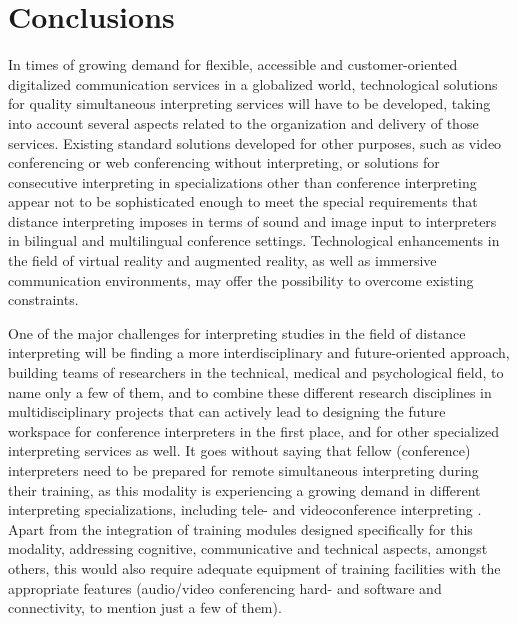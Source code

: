\documentclass[output=paper]{langsci/langscibook}
\begin{document}
\section{Conclusions}
\label{sec:ziegler:07}
In times of growing demand for flexible, accessible and customer-oriented digitalized communication services in a globalized world, technological solutions for quality simultaneous interpreting services will have to be developed, taking into account several aspects related to the organization and delivery of those services. Existing standard solutions developed for other purposes, such as video conferencing or web conferencing without interpreting, or solutions for consecutive interpreting in specializations other than conference interpreting appear not to be sophisticated enough to meet the special requirements that distance interpreting imposes in terms of sound and image input to interpreters in bilingual and multilingual conference settings. Technological enhancements in the field of virtual reality and augmented reality, as well as immersive communication environments, may offer the possibility to overcome existing constraints.

One of the major challenges for interpreting studies in the field of distance interpreting will be finding a more interdisciplinary and future-oriented approach, building teams of researchers in the technical, medical and psychological field, to name only a few of them, and to combine these different research disciplines in multidisciplinary projects that can actively lead to designing the future work\-space for conference interpreters in the first place, and for other specialized interpreting services as well. It goes without saying that fellow (conference) interpreters need to be prepared for remote simultaneous interpreting during their training, as this modality is experiencing a growing demand in different interpreting specializations, including tele- and videoconference interpreting \citep{Braun2015}. Apart from the integration of training modules designed specifically for this modality, addressing cognitive, communicative and technical aspects, amongst others, this would also require adequate equipment of training facilities with the appropriate features (audio/video conferencing hard- and software and connectivity, to mention just a few of them).
 
\nocite{ISO2603,ISO4043,AVIDICUS1,AVIDICUS2,AVIDICUS3}
{\sloppy\printbibliography[heading=subbibliography,notkeyword=this]}
\end{document}
